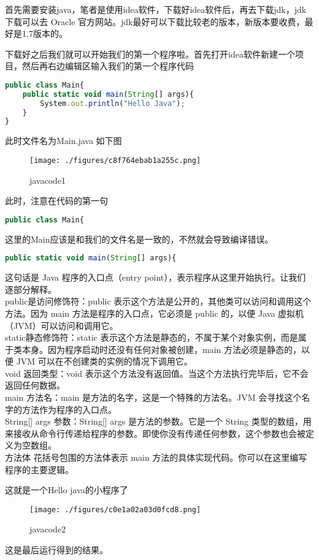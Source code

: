

首先需要安装java，笔者是使用idea软件，下载好idea软件后，再去下载jdk，jdk下载可以去 Oracle 官方网站。jdk最好可以下载比较老的版本，新版本要收费，最好是1.7版本的。

下载好之后我们就可以开始我们的第一个程序啦。首先打开idea软件新建一个项目，然后再右边编辑区输入我们的第一个程序代码
\begin{lstlisting}[language=js]
public class Main{
    public static void main(String[] args){
        System.out.println("Hello Java");
    }
}
\end{lstlisting}
此时文件名为Main.java
如下图\begin{figure}[ht]
\centering
\texttt{[image: ./figures/c8f764ebab1a255c.png]}
\caption{javacode1} \label{fig_java_1}
\end{figure}
此时，注意在代码的第一句
\begin{lstlisting}[language=js]
public class Main{
\end{lstlisting}
这里的Main应该是和我们的文件名是一致的，不然就会导致编译错误。
\begin{lstlisting}[language=js]
 public static void main(String[] args){
\end{lstlisting}

这句话是 Java 程序的入口点（entry point），表示程序从这里开始执行。让我们逐部分解释。\\
public是访问修饰符：public 表示这个方法是公开的，其他类可以访问和调用这个方法。因为 main 方法是程序的入口点，它必须是 public 的，以便 Java 虚拟机（JVM）可以访问和调用它。
\\
static静态修饰符：static 表示这个方法是静态的，不属于某个对象实例，而是属于类本身。因为程序启动时还没有任何对象被创建，main 方法必须是静态的，以便 JVM 可以在不创建类的实例的情况下调用它。\\
void
返回类型：void 表示这个方法没有返回值。当这个方法执行完毕后，它不会返回任何数据。\\
main
方法名：main 是方法的名字，这是一个特殊的方法名。JVM 会寻找这个名字的方法作为程序的入口点。\\
String[] args
参数：String[] args 是方法的参数。它是一个 String 类型的数组，用来接收从命令行传递给程序的参数。即使你没有传递任何参数，这个参数也会被定义为空数组。\\
方法体
{ } 花括号包围的方法体表示 main 方法的具体实现代码。你可以在这里编写程序的主要逻辑。

这就是一个Hello java的小程序了\begin{figure}[ht]
\centering
\texttt{[image: ./figures/c0e1a02a03d0fcd8.png]}
\caption{javacode2} \label{fig_java_2}
\end{figure}
这是最后运行得到的结果。